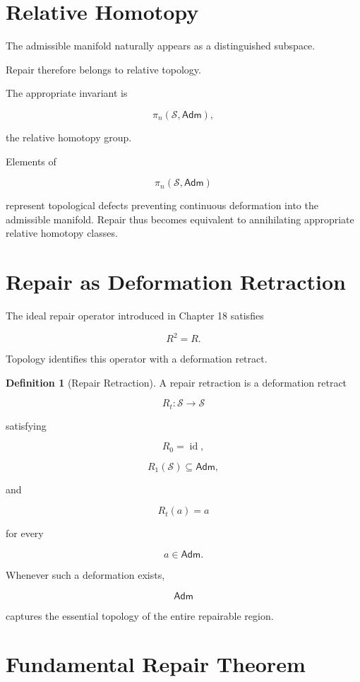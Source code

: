 \documentclass[11pt,oneside]{book}
\numberwithin{equation}{chapter}
\theoremstyle{definition}
\newtheorem{definition}{Definition}[chapter]
\theoremstyle{plain}
\DeclareMathOperator{\id}{id}
\newcommand{\State}{\mathcal{S}}
\newcommand{\Adm}{\mathsf{Adm}}
\begin{document}
\section{Relative Homotopy}

The admissible manifold naturally appears as a distinguished subspace.

Repair therefore belongs to relative topology.

The appropriate invariant is

\[
\pi_n(\State,\Adm),
\]

the relative homotopy group.

Elements of

\[
\pi_n(\State,\Adm)
\]

represent topological defects preventing continuous deformation into the admissible manifold. Repair thus becomes equivalent to annihilating appropriate relative homotopy classes.

\section{Repair as Deformation Retraction}

The ideal repair operator introduced in Chapter 18 satisfies

\[
R^2=R.
\]

Topology identifies this operator with a deformation retract.

\begin{definition}[Repair Retraction]

A repair retraction is a deformation retract

\[
R_t:
\State
\rightarrow
\State
\]

satisfying

\[
R_0=\id,
\]

\[
R_1(\State)\subseteq\Adm,
\]

and

\[
R_t(a)=a
\]

for every

\[
a
\in
\Adm.
\]

\end{definition}

Whenever such a deformation exists,

\[
\Adm
\]

captures the essential topology of the entire repairable region.

\section{Fundamental Repair Theorem}
\end{document}
